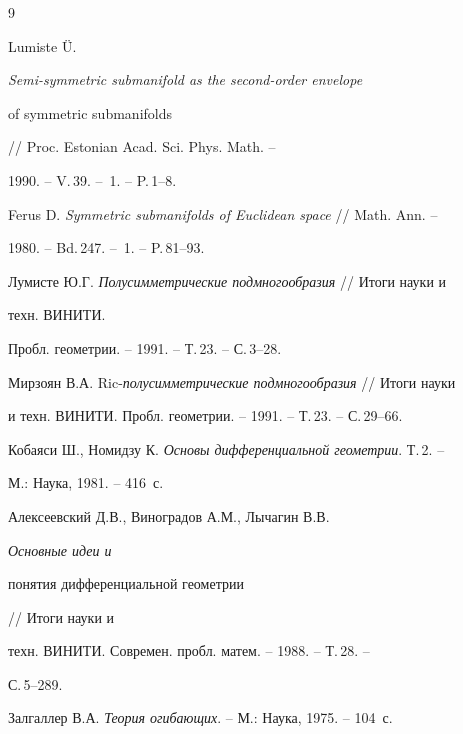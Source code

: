 \begin{thebibliography}{9} 


 




Lumiste \"U. {\em Semi-symmetric submanifold as the second-order envelope 


of symmetric submanifolds} // Proc. Estonian Acad. Sci. Phys. Math. -- 


1990. -- V.\,39. -- \No\,1. -- P.\,1--8. 




Ferus D. {\em Symmetric submanifolds of Euclidean space} // Math. Ann. -- 


1980. -- Bd.\,247. -- \No\,1. -- P.\,81--93. 




Лумисте Ю.Г. {\em Полусимметрические подмногообразия} // Итоги науки и 


техн. ВИНИТИ.\linebreak%


Пробл. геометрии. -- 1991. -- Т.\,23. -- С.\,3--28. 




Мирзоян В.А. Ric-{\em{}полусимметрические подмногообразия} // Итоги науки 


и техн. ВИНИТИ. Пробл. геометрии. -- 1991. -- Т.\,23. -- С.\,29--66. 




Кобаяси Ш., Номидзу К. {\em Основы дифференциальной геометрии}. Т.\,2. -- 


М.: Наука, 1981. -- 416~с. 




Алексеевский Д.В., Виноградов А.М., Лычагин В.В. {\em Основные идеи и 


понятия дифференциальной геометрии} // Итоги науки и 


техн. ВИНИТИ. Современ. пробл. матем. -- 1988. -- Т.\,28. -- 


С.\,5--289. 




Залгаллер В.А. {\em Теория огибающих}. -- М.: Наука, 1975. -- 104~с. 


 


\end{thebibliography} 


 


\vskip 2cm 


 






 


 


